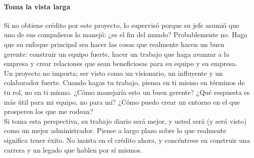 \documentclass[10pt]{book}
\begin{document}
\paragraph{Toma la vista larga}
Si no obtiene crédito por este proyecto, lo supervisó porque su jefe asumió que uno de sus compañeros lo manejó: ¿es el fin del mundo? Probablemente no. Haga que su enfoque principal sea hacer las cosas que realmente hacen un buen gerente: construir un equipo fuerte, hacer un trabajo que haga avanzar a la empresa y crear relaciones que sean beneficiosas para su equipo y su empresa.\\
Un proyecto no importa; ser visto como un visionario, un influyente y un colaborador fuerte. Cuando hagas tu trabajo, piensa en ti mismo en términos de tu rol, no en ti mismo. ¿Cómo manejaría esto un buen gerente? ¿Qué respuesta es más útil para mi equipo, no para mí? ¿Cómo puedo crear un entorno en el que prosperen los que me rodean?\\
Si toma esta perspectiva, su trabajo diario será mejor, y usted será (y será visto) como un mejor administrador. Piense a largo plazo sobre lo que realmente significa tener éxito. No insista en el crédito ahora, y concéntrese en construir una carrera y un legado que hablen por sí mismos.
\end{document}
